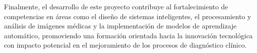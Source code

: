 Finalmente, el desarrollo de este proyecto contribuye al fortalecimiento de competencias en áreas como el diseño de sistemas inteligentes, el procesamiento y análisis de imágenes médicas y la implementación de modelos de aprendizaje automático, promoviendo una formación orientada hacia la innovación tecnológica con impacto potencial en el mejoramiento de los procesos de diagnóstico clínico.





